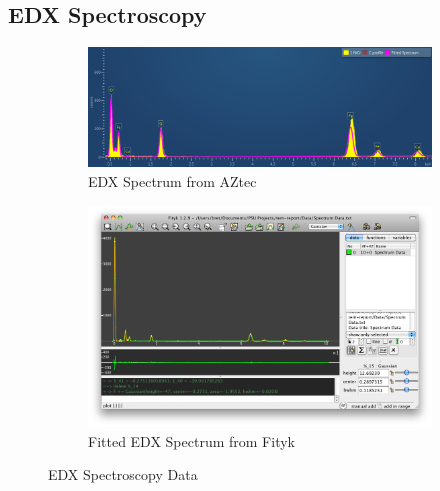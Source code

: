 \documentclass[12pt,a4paper]{article}
\begin{document}

\subsection{EDX Spectroscopy} %
\label{sub:edx_spectroscopy}

\lipsum[6] %

\lipsum[6] %

\lipsum[6] %

\begin{figure}
  \begin{subfigure}[b]{0.5\textwidth}
    \includegraphics[width=\textwidth]{Data/EDS Spectrum.png}
    \caption{EDX Spectrum from AZtec}
    \label{fig:aztec}
  \end{subfigure}%

  \begin{subfigure}[b]{0.5\textwidth}
    \includegraphics[width=\textwidth]{Data/full.png}
    \caption{Fitted EDX Spectrum from Fityk}
    \label{fig:fitk}
  \end{subfigure}%

  \caption{EDX Spectroscopy Data}
  \label{fig:edx}
\end{figure}
\end{document}
